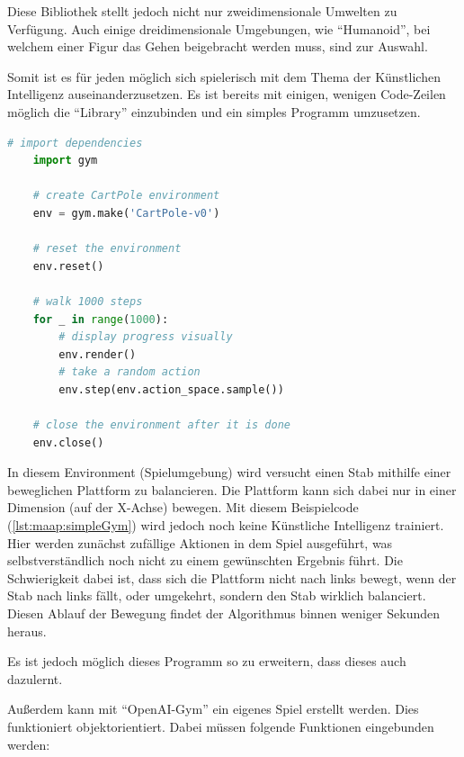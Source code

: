 Diese Bibliothek stellt jedoch nicht nur zweidimensionale Umwelten zu Verfügung. Auch einige dreidimensionale Umgebungen, wie ``Humanoid'', bei welchem einer Figur das Gehen beigebracht werden muss, sind zur Auswahl.

Somit ist es für jeden möglich sich spielerisch mit dem Thema der Künstlichen Intelligenz auseinanderzusetzen. Es ist bereits mit einigen, wenigen Code-Zeilen möglich die ``Library'' einzubinden und ein simples Programm umzusetzen.
\begin{lstlisting}[language=Python,label=lst:maap:simpleGym,caption=Simples OpenAI-Gym Programm]
    # import dependencies
    import gym 

    # create CartPole environment
    env = gym.make('CartPole-v0') 

    # reset the environment
    env.reset() 

    # walk 1000 steps
    for _ in range(1000): 
        # display progress visually
        env.render() 
        # take a random action
        env.step(env.action_space.sample()) 
        
    # close the environment after it is done
    env.close()
\end{lstlisting}


In diesem Environment (Spielumgebung) wird versucht einen Stab mithilfe einer beweglichen Plattform zu balancieren. Die Plattform kann sich dabei nur in einer Dimension (auf der X-Achse) bewegen. Mit diesem Beispielcode (\ref{lst:maap:simpleGym}) wird jedoch noch keine Künstliche Intelligenz trainiert. Hier werden zunächst zufällige Aktionen in dem Spiel ausgeführt, was selbstverständlich noch nicht zu einem gewünschten Ergebnis führt. Die Schwierigkeit dabei ist, dass sich die Plattform nicht nach links bewegt, wenn der Stab nach links fällt, oder umgekehrt, sondern den Stab wirklich balanciert. Diesen Ablauf der Bewegung findet der Algorithmus binnen weniger Sekunden heraus.

Es ist jedoch möglich dieses Programm so zu erweitern, dass dieses auch dazulernt.

Außerdem kann mit ``OpenAI-Gym'' ein eigenes Spiel erstellt werden. Dies funktioniert objektorientiert. Dabei müssen folgende Funktionen eingebunden werden:


